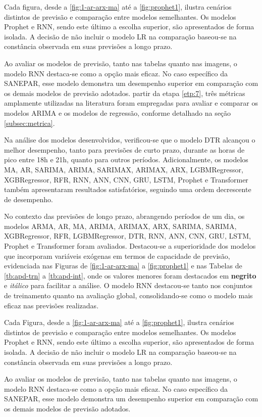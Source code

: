Cada figura, desde a \ref{fig:1-ar-arx-ma} até a \ref{fig:prophet1}, ilustra cenários distintos de previsão e comparação entre modelos semelhantes. Os modelos Prophet e RNN, sendo este último a escolha superior, são apresentados de forma isolada. A decisão de não incluir o modelo LR na comparação baseou-se na constância observada em suas previsões a longo prazo.

Ao avaliar os modelos de previsão, tanto nas tabelas quanto nas imagens, o modelo RNN destaca-se como a opção mais eficaz. No caso específico da SANEPAR, esse modelo demonstra um desempenho superior em comparação com os demais modelos de previsão adotados. partir da etapa \ref{etp:7}, três métricas amplamente utilizadas na literatura foram empregadas para avaliar e comparar os modelos ARIMA e os modelos de regressão, conforme detalhado na seção \ref{subsec:metrica}.

Na análise dos modelos desenvolvidos, verificou-se que o modelo DTR alcançou o melhor desempenho, tanto para previsões de curto prazo, durante as horas de pico entre 18h e 21h, quanto para outros períodos. Adicionalmente, os modelos MA, AR, SARIMA, ARIMA, SARIMAX, ARIMAX, ARX, LGBMRegressor, XGBRegressor, RFR, RNN, ANN, CNN, GRU, LSTM, Prophet e Transformer também apresentaram resultados satisfatórios, seguindo uma ordem decrescente de desempenho.

No contexto das previsões de longo prazo, abrangendo períodos de um dia, os modelos ARMA, AR, MA, ARIMA, ARIMAX, ARX, SARIMA, SARIMA, XGBRegressor, RFR, LGBMRegressor, DTR, RNN, ANN, CNN, GRU, LSTM, Prophet e Transformer foram avaliados. Destacou-se a superioridade dos modelos que incorporam variáveis exógenas em termos de capacidade de previsão, evidenciada nas Figuras de \ref{fig:1-ar-arx-ma} a \ref{fig:prophet1} e nas Tabelas de \ref{tb:apd-trn} a \ref{tb:apd-int}, onde os valores menores foram destacados em \textbf{negrito} e \textit{itálico} para facilitar a análise. O modelo RNN destacou-se tanto nos conjuntos de treinamento quanto na avaliação global, consolidando-se como o modelo mais eficaz nas previsões realizadas.

Cada Figura, desde a \ref{fig:1-ar-arx-ma} até a \ref{fig:prophet1}, ilustra cenários distintos de previsão e comparação entre modelos semelhantes. Os modelos Prophet e RNN, sendo este último a escolha superior, são apresentados de forma isolada. A decisão de não incluir o modelo LR na comparação baseou-se na constância observada em suas previsões a longo prazo.

Ao avaliar os modelos de previsão, tanto nas tabelas quanto nas imagens, o modelo RNN destaca-se como a opção mais eficaz. No caso específico da SANEPAR, esse modelo demonstra um desempenho superior em comparação com os demais modelos de previsão adotados.


